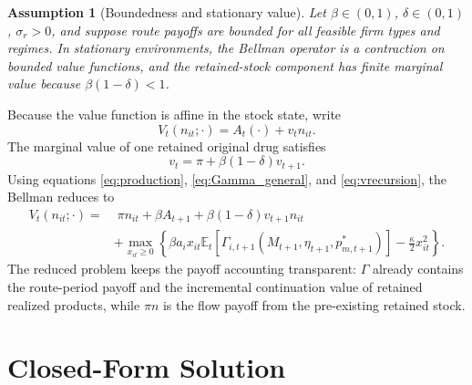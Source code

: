 \documentclass[12pt]{article}
\newtheorem{assumption}{Assumption}
\newcommand{\E}{\mathbb{E}}
\newcommand{\1}{\mathbf{1}}
\begin{document}
\begin{assumption}[Boundedness and stationary value]
\label{ass:bounded_stationary}
Let $\beta\in(0,1)$, $\delta\in(0,1)$, $\sigma_r>0$, and suppose route payoffs are bounded for all feasible firm types and regimes. In stationary environments, the Bellman operator is a contraction on bounded value functions, and the retained-stock component has finite marginal value because $\beta(1-\delta)<1$.
\end{assumption}

Because the value function is affine in the stock state, write
\begin{equation}
    V_t(n_{it};\cdot)=A_t(\cdot)+v_t n_{it}.
    \label{eq:affine}
\end{equation}
The marginal value of one retained original drug satisfies
\begin{equation}
    v_t=\pi+\beta(1-\delta)v_{t+1}.
    \label{eq:vrecursion}
\end{equation}
Using equations \eqref{eq:production}, \eqref{eq:Gamma_general}, and \eqref{eq:vrecursion}, the Bellman reduces to
\begin{align}
V_t(n_{it};\cdot)
=&\; \pi n_{it}+\beta A_{t+1}+\beta(1-\delta)v_{t+1}n_{it} \nonumber\\
&+\max_{x_{it}\ge0}\left\{
\beta a_i x_{it}
\E_t\left[\Gamma_{i,t+1}(M_{t+1},\eta_{t+1},p^*_{m,t+1})\right]
-\frac{\kappa}{2}x_{it}^2
\right\}.
\label{eq:Bellman_reduced}
\end{align}
The reduced problem keeps the payoff accounting transparent: $\Gamma$ already contains the route-period payoff and the incremental continuation value of retained realized products, while $\pi n$ is the flow payoff from the pre-existing retained stock.

\section{Closed-Form Solution}
\end{document}
